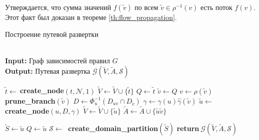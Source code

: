 \documentclass[../thesis.tex]{subfiles}
\begin{document}
Утверждается, что сумма значений $f(\tilde{v})$ по всем $\tilde{v}\in \rho^{-1}(v)$ есть поток $f(v)$.
Этот факт был доказан в теореме \ref{th:flow_propagation}.
\\

\begin{algorithm}
\caption{Построение путевой развертки} \label{alg:create_path_scan}
\hspace*{\algorithmicindent} \\
\hspace*{\algorithmicindent} \textbf{Input:} Граф зависимостей правил $G$ \\
\hspace*{\algorithmicindent} \textbf{Output:} Путевая развертка $\mathcal{G}(\widetilde{V}, \widetilde{A}, \mathscr{S})$
\begin{algorithmic}[1]
    \State $\tilde{t}\gets\ $\textbf{create\_node}$(t, \mathcal{N}, 1)$
    \State $\widetilde{V}\gets \widetilde{V}\cup \{\tilde{t}\}$
    \State $Q\gets \tilde{t}$
\EndFor
{} \label{alg:create_path_scan:main_loop_begin}
    \State $\tilde{v}\gets Q$
    \State $v\gets \rho(\tilde{v})$
            \State \textbf{prune\_branch}$(\tilde{v})$
        \Else
            \State $D\gets \Phi^{-1}_{u}(D_{uv}\cap D_{\tilde{v}})$
            \State $\gamma\gets \gamma(u)\hat{\gamma}(\tilde{v})$
            \State $\tilde{u}\gets\ $\textbf{create\_node}$(u,D,\gamma)$
            \State $\widetilde{V}\gets \widetilde{V}\cup \{\tilde{u}\}$
            \State $\widetilde{A}\gets \widetilde{A}\cup \{\tilde{u}\tilde{v}\}$
            
                \State $\widetilde{S}\gets \tilde{u}$
            \Else
                \State $Q\gets \tilde{u}$
            \EndIf
        \EndIf
    \EndFor
\EndWhile \label{alg:create_path_scan:main_loop_end}
\State $\mathscr{S}\gets\ $ \textbf{create\_domain\_partition}$(\widetilde{S})$ \label{alg:create_path_scan:create_domain_partition}
\State \textbf{return}$\ \mathcal{G}(\widetilde{V}, \widetilde{A}, \mathscr{S})$
\EndProcedure
\end{algorithmic}
\end{algorithm}
\end{document}
